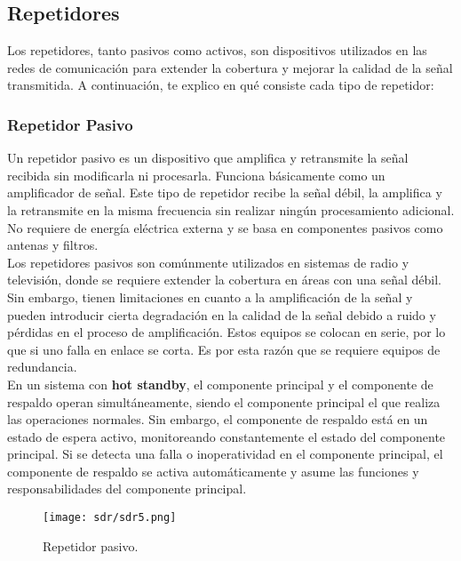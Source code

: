 \documentclass[
	12pt, %
	fleqn, %
	a4paper, %
	oneside, %
]{LegrandOrangeBook}
\begin{document}
\subsection{Repetidores}
Los repetidores, tanto pasivos como activos, son dispositivos utilizados en las redes de comunicación para extender la cobertura y mejorar la calidad de la señal transmitida. A continuación, te explico en qué consiste cada tipo de repetidor:\\
\subsubsection{Repetidor Pasivo}
Un repetidor pasivo es un dispositivo que amplifica y retransmite la señal recibida sin modificarla ni procesarla. Funciona básicamente como un amplificador de señal. Este tipo de repetidor recibe la señal débil, la amplifica y la retransmite en la misma frecuencia sin realizar ningún procesamiento adicional. No requiere de energía eléctrica externa y se basa en componentes pasivos como antenas y filtros.\\
Los repetidores pasivos son comúnmente utilizados en sistemas de radio y televisión, donde se requiere extender la cobertura en áreas con una señal débil. Sin embargo, tienen limitaciones en cuanto a la amplificación de la señal y pueden introducir cierta degradación en la calidad de la señal debido a ruido y pérdidas en el proceso de amplificación. Estos equipos se colocan en serie, por lo que si uno falla en enlace se corta. Es por esta razón que se requiere equipos de redundancia.\\
En un sistema con \textbf{hot standby}, el componente principal y el componente de respaldo operan simultáneamente, siendo el componente principal el que realiza las operaciones normales. Sin embargo, el componente de respaldo está en un estado de espera activo, monitoreando constantemente el estado del componente principal. Si se detecta una falla o inoperatividad en el componente principal, el componente de respaldo se activa automáticamente y asume las funciones y responsabilidades del componente principal.
\begin{figure}[H]
\centering
\texttt{[image: sdr/sdr5.png]}
\caption{Repetidor pasivo.}
\end{figure}
\end{document}
